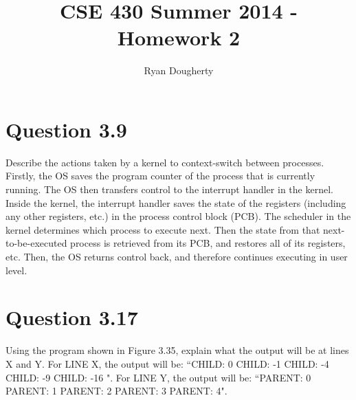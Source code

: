 \documentclass[12pt]{article}
\title{CSE 430 Summer 2014 - Homework 2}
\author{Ryan Dougherty}
\date{}                                           %
\begin{document}
\maketitle

\section*{Question 3.9} {\color{blue}Describe the actions taken by a kernel to context-switch between processes.}
Firstly, the OS saves the program counter of the process that is currently running. The OS then transfers control to the interrupt handler in the kernel. Inside the kernel, the interrupt handler saves the state of the registers (including any other registers, etc.) in the process control block (PCB). The scheduler in the kernel determines which process to execute next. Then the state from that next-to-be-executed process is retrieved from its PCB, and restores all of its registers, etc. Then, the OS returns control back, and therefore continues executing in user level.

\section*{Question 3.17} {\color{blue}Using the program shown in Figure 3.35, explain what the output will be at lines X and Y.} For LINE X, the output will be: ``CHILD: 0 CHILD: -1 CHILD: -4 CHILD: -9 CHILD: -16 ". For LINE Y, the output will be: ``PARENT: 0 PARENT: 1 PARENT: 2 PARENT: 3 PARENT: 4".
\end{document}
